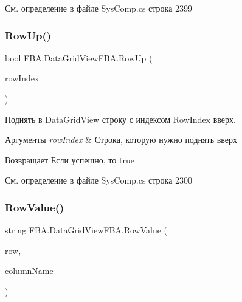 См. определение в файле Sys\+Comp.\+cs строка 2399

\mbox{\label{class_f_b_a_1_1_data_grid_view_f_b_a_af065f90cec3e5673d093c68e81852522}} 
\subsubsection{\texorpdfstring{Row\+Up()}{RowUp()}}
{\footnotesize\ttfamily bool F\+B\+A.\+Data\+Grid\+View\+F\+B\+A.\+Row\+Up (\begin{DoxyParamCaption}\item[{int}]{row\+Index }\end{DoxyParamCaption})}



Поднять в Data\+Grid\+View строку с индексом Row\+Index вверх. 


\begin{DoxyParams}{Аргументы}
{\em row\+Index} & Строка, которую нужно поднять вверх\\
\hline
\end{DoxyParams}
\begin{DoxyReturn}{Возвращает}
Если успешно, то true
\end{DoxyReturn}


См. определение в файле Sys\+Comp.\+cs строка 2300

\mbox{\label{class_f_b_a_1_1_data_grid_view_f_b_a_a94a049f02fa7e5dea582532d67212ddc}} 
\subsubsection{\texorpdfstring{Row\+Value()}{RowValue()}}
{\footnotesize\ttfamily string F\+B\+A.\+Data\+Grid\+View\+F\+B\+A.\+Row\+Value (\begin{DoxyParamCaption}\item[{Data\+Grid\+View\+Row}]{row,  }\item[{string}]{column\+Name }\end{DoxyParamCaption})}



